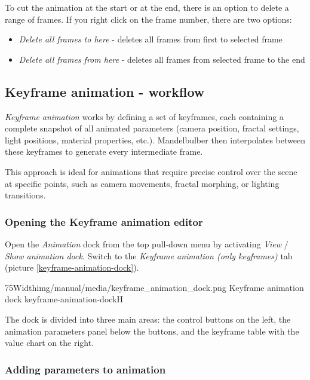 	To cut the animation at the start or at the end, there is an option to delete a range of frames. If you right click on the frame number, there are two options:
	\begin{itemize}
		\item \emph{Delete all frames to here} - deletes all frames from first to selected frame
		\item \emph{Delete all frames from here} - deletes all frames from selected frame to the end
	\end{itemize}
	
	
	


\subsection{Keyframe animation - workflow}\label{keyframe-animation}

\emph{Keyframe animation} works by defining a set of keyframes, each containing a complete snapshot of all animated parameters (camera position, fractal settings, light positions, material properties, etc.). Mandelbulber then interpolates between these keyframes to generate every intermediate frame.

This approach is ideal for animations that require precise control over the scene at specific points, such as camera movements, fractal morphing, or lighting transitions.

\subsubsection{Opening the Keyframe animation editor}

Open the \emph{Animation} dock from the top pull-down menu by activating \emph{View} / \emph{Show animation dock}. Switch to the \emph{Keyframe animation (only keyframes)} tab (picture \ref{keyframe-animation-dock}).

\simpleImageWithCaption75Width{img/manual/media/keyframe_animation_dock.png}
{Keyframe animation dock}
{keyframe-animation-dock}{H}

The dock is divided into three main areas: the control buttons on the left, the animation parameters panel below the buttons, and the keyframe table with the value chart on the right.

\subsubsection{Adding parameters to animation}

